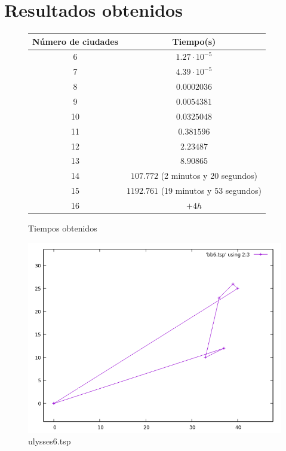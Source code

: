 \documentclass[12pt,spanish]{article}
\begin{document}
\section{Resultados obtenidos}

\begin{figure}[H]
\centering
\begin{tabular}{|c|c|}
\hline
\textbf{Número de ciudades} & \textbf{Tiempo(s)}\\
\hline
6 & $1.27 \cdot 10^{-5}$\\
\hline
7 & $4.39 \cdot 10^{-5}$\\
\hline
8 & $0.0002036$\\
\hline
9 & $0.0054381$\\
\hline
10 & $0.0325048$\\
\hline
11 & $0.381596$\\
\hline
12 & $2.23487$\\
\hline
13 & $8.90865$\\
\hline
14 & $107.772$ (2 minutos y 20 segundos)\\
\hline
15 & $1192.761$ (19 minutos y 53 segundos)\\
\hline
16 & $ + 4h $ \\
\hline
\end{tabular}
\caption{Tiempos obtenidos}
\end{figure}

\begin{figure}[H]
\centering
\includegraphics[scale=0.75]{bb6.png}
\caption{ulysses6.tsp}
\end{figure}
\end{document}

